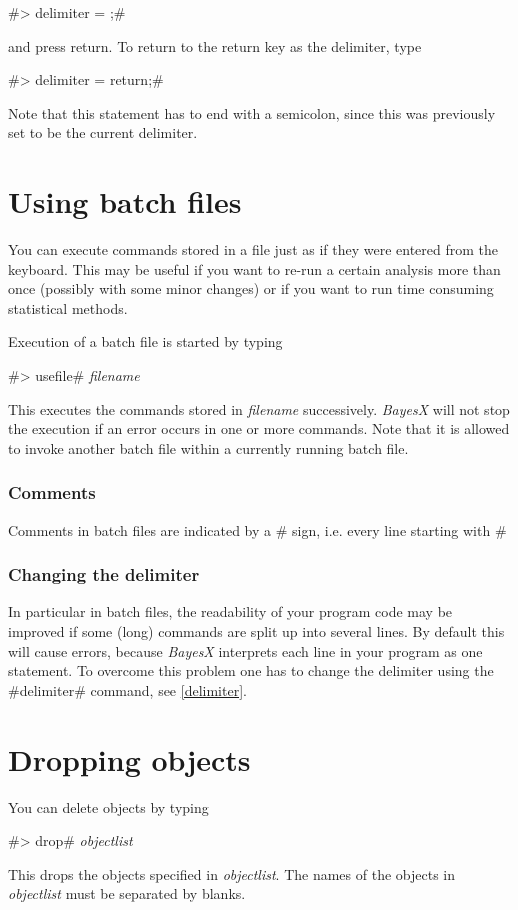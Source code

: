 #> delimiter = ;#

and press return. To return to the return key as the delimiter, type

#> delimiter = return;#

Note that this statement has to end with a semicolon, since this
was previously set to be the current delimiter.


\section{Using batch files}
\label{batch} 

You can execute commands stored in a file just as if they were
entered from the keyboard. This may be useful if you want to
re-run a certain analysis more than once (possibly with some minor
changes) or if you want to run time consuming statistical methods.

Execution of a batch file is started by typing

#> usefile# {\em filename}

This executes the commands stored in {\em filename} successively.
{\em BayesX} will not stop the execution if an error occurs in one
or more commands. Note that it is allowed to invoke another batch
file within a currently running batch file.


\subsubsection*{Comments}

Comments in batch files are indicated by a  #%
sign, i.e. every line
starting with #%

\subsubsection*{Changing the delimiter}

In particular in batch files, the readability of your program code
may be improved if some (long) commands are split up into several
lines. By default this will cause errors, because {\em BayesX}
interprets each line in your program as one statement. To overcome
this problem one has to change the delimiter using the #delimiter#
command, see \autoref{delimiter}.

\section{Dropping objects}
 

You can delete objects by typing

#> drop# {\em objectlist}

This drops the objects specified in {\em objectlist}. The names of
the objects in {\em objectlist} must be separated by blanks.
